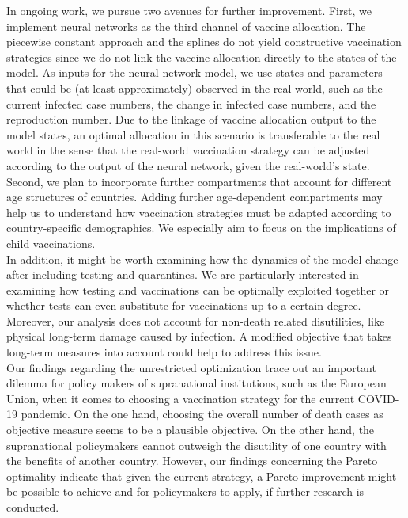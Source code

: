In ongoing work, we pursue two avenues for further improvement. First, we implement neural networks as the third channel of vaccine allocation. The piecewise constant approach and the splines do not yield constructive vaccination strategies since we do not link the vaccine allocation directly to the states of the model. As inputs for the neural network model, we use states and parameters that could be (at least approximately) observed in the real world, such as the current infected case numbers, the change in infected case numbers, and the reproduction number. Due to the linkage of vaccine allocation output to the model states, an optimal allocation in this scenario is transferable to the real world in the sense that the real-world vaccination strategy can be adjusted according to the output of the neural network, given the real-world's state. Second, we plan to incorporate further compartments that account for different age structures of countries. Adding further age-dependent compartments may help us to understand how vaccination strategies must be adapted according to country-specific demographics. We especially aim to focus on the implications of child vaccinations.  \\




In addition, it might be worth examining how the dynamics of the model change after including testing and quarantines. We are particularly interested in examining how testing and vaccinations can be optimally exploited together or whether tests can even substitute for vaccinations up to a certain degree. Moreover, our analysis does not account for non-death related disutilities, like physical long-term damage caused by infection. A modified objective that takes long-term measures into account could help to address this issue. \\




Our findings regarding the unrestricted optimization trace out an important dilemma for policy makers of supranational institutions, such as the European Union, when it comes to choosing a vaccination strategy for the current COVID-19 pandemic. On the one hand, choosing the overall number of death cases as objective measure seems to be a plausible objective. On the other hand, the supranational policymakers cannot outweigh the disutility of one country with the benefits of another country. However, our findings concerning the Pareto optimality indicate that given the current strategy, a Pareto improvement might be possible to achieve and for policymakers to apply, if further research is conducted.



